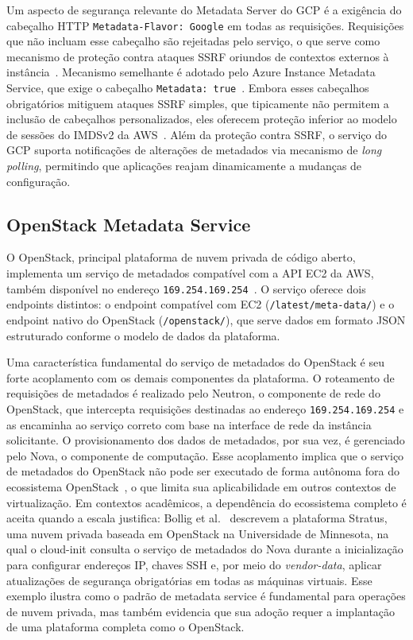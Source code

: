 Um aspecto de segurança relevante do Metadata Server do GCP é a exigência do cabeçalho HTTP \texttt{Metadata-Flavor: Google} em todas as requisições. Requisições que não incluam esse cabeçalho são rejeitadas pelo serviço, o que serve como mecanismo de proteção contra ataques SSRF oriundos de contextos externos à instância~\citep{gcp_metadata}. Mecanismo semelhante é adotado pelo Azure Instance Metadata Service, que exige o cabeçalho \texttt{Metadata: true}~\citep{azure_imds}. Embora esses cabeçalhos obrigatórios mitiguem ataques SSRF simples, que tipicamente não permitem a inclusão de cabeçalhos personalizados, eles oferecem proteção inferior ao modelo de sessões do IMDSv2 da AWS~\citep{aws_imdsv2_blog}. Além da proteção contra SSRF, o serviço do GCP suporta notificações de alterações de metadados via mecanismo de \textit{long polling}, permitindo que aplicações reajam dinamicamente a mudanças de configuração.

\subsection{OpenStack Metadata Service}

O OpenStack, principal plataforma de nuvem privada de código aberto, implementa um serviço de metadados compatível com a API EC2 da AWS, também disponível no endereço \texttt{169.254.169.254}~\citep{openstack_metadata}. O serviço oferece dois endpoints distintos: o endpoint compatível com EC2 (\texttt{/latest/meta-data/}) e o endpoint nativo do OpenStack (\texttt{/openstack/}), que serve dados em formato JSON estruturado conforme o modelo de dados da plataforma.

Uma característica fundamental do serviço de metadados do OpenStack é seu forte acoplamento com os demais componentes da plataforma. O roteamento de requisições de metadados é realizado pelo Neutron, o componente de rede do OpenStack, que intercepta requisições destinadas ao endereço \texttt{169.254.169.254} e as encaminha ao serviço correto com base na interface de rede da instância solicitante. O provisionamento dos dados de metadados, por sua vez, é gerenciado pelo Nova, o componente de computação. Esse acoplamento implica que o serviço de metadados do OpenStack não pode ser executado de forma autônoma fora do ecossistema OpenStack~\citep{openstack_metadata}, o que limita sua aplicabilidade em outros contextos de virtualização. Em contextos acadêmicos, a dependência do ecossistema completo é aceita quando a escala justifica: Bollig et al.~\citeyearpar{bollig2018leveraging} descrevem a plataforma Stratus, uma nuvem privada baseada em OpenStack na Universidade de Minnesota, na qual o cloud-init consulta o serviço de metadados do Nova durante a inicialização para configurar endereços IP, chaves SSH e, por meio do \textit{vendor-data}, aplicar atualizações de segurança obrigatórias em todas as máquinas virtuais. Esse exemplo ilustra como o padrão de metadata service é fundamental para operações de nuvem privada, mas também evidencia que sua adoção requer a implantação de uma plataforma completa como o OpenStack.

